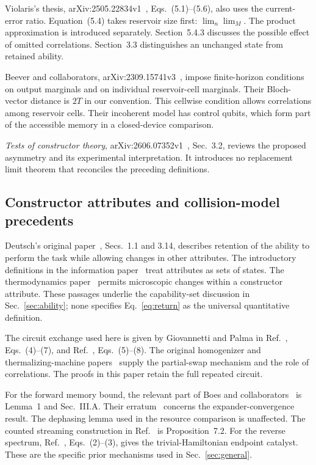 Violaris's thesis, arXiv:2505.22834v1~\cite{thesis}, Eqs.~(5.1)--(5.6), also uses the current-error ratio. Equation~(5.4) takes reservoir size first: $\lim_n\lim_M$. The product approximation is introduced separately. Section~5.4.3 discusses the possible effect of omitted correlations. Section~3.3 distinguishes an unchanged state from retained ability.

Beever and collaborators, arXiv:2309.15741v3~\cite{beever}, impose finite-horizon conditions on output marginals and on individual reservoir-cell marginals. Their Bloch-vector distance is $2T$ in our convention. This cellwise condition allows correlations among reservoir cells. Their incoherent model has control qubits, which form part of the accessible memory in a closed-device comparison.

\emph{Tests of constructor theory}, arXiv:2606.07352v1~\cite{tests}, Sec.~3.2, reviews the proposed asymmetry and its experimental interpretation. It introduces no replacement limit theorem that reconciles the preceding definitions.

\subsection{Constructor attributes and collision-model precedents}

Deutsch's original paper~\cite{deutsch}, Secs.~1.1 and 3.14, describes retention of the ability to perform the task while allowing changes in other attributes. The introductory definitions in the information paper~\cite{information} treat attributes as sets of states. The thermodynamics paper~\cite{thermo} permits microscopic changes within a constructor attribute. These passages underlie the capability-set discussion in Sec.~\ref{sec:ability}; none specifies Eq.~\eqref{eq:return} as the universal quantitative definition.

The circuit exchange used here is given by Giovannetti and Palma in Ref.~\cite{gp}, Eqs.~(4)--(7), and Ref.~\cite{cascade}, Eqs.~(5)--(8). The original homogenizer and thermalizing-machine papers~\cite{ziman,scarani} supply the partial-swap mechanism and the role of correlations. The proofs in this paper retain the full repeated circuit.

For the forward memory bound, the relevant part of Boes and collaborators~\cite{boes} is Lemma~1 and Sec.~III.A. Their erratum~\cite{boeserratum} concerns the expander-convergence result. The dephasing lemma used in the resource comparison is unaffected. The counted streaming construction in Ref.~\cite{douglas} is Proposition~7.2. For the reverse spectrum, Ref.~\cite{ng}, Eqs.~(2)--(3), gives the trivial-Hamiltonian endpoint catalyst. These are the specific prior mechanisms used in Sec.~\ref{sec:general}.
